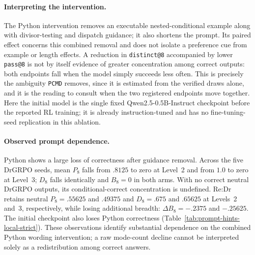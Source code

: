 \documentclass{article}
\newcommand{\1}{\mathbf 1}
\newcommand{\pmd}{\texttt{PCMD}}
\theoremstyle{remark}
\theoremstyle{definition}
\theoremstyle{plain}
\begin{document}
\paragraph{Interpreting the intervention.}
The Python intervention removes an executable nested-conditional example
along with divisor-testing and dispatch guidance; it also shortens the prompt.
Its paired effect concerns this combined removal and does not isolate a
preference cue from example or length effects. A reduction in
\texttt{distinct@8} accompanied by lower \texttt{pass@8} is not by itself
evidence of greater concentration among correct outputs: both endpoints fall
when the model simply succeeds less often. This is precisely the ambiguity
\pmd{} removes, since it is estimated from the verified draws alone, and it is
the reading to consult when the two registered endpoints move together.
Here the initial model is the single fixed Qwen2.5-0.5B-Instruct checkpoint
before the reported RL training; it is already instruction-tuned and has no
fine-tuning-seed replication in this ablation.


\paragraph{Observed prompt dependence.}
Python shows a large loss of correctness after guidance removal. Across the
five DrGRPO seeds, mean $P_8$ falls from $.8125$ to zero at Level~2 and from
$1.0$ to zero at Level~3; $D_8$ falls identically and $B_8=0$ in both arms.
With no correct neutral DrGRPO outputs, its conditional-correct concentration
is undefined. Re:Dr retains neutral $P_8=.55625$ and $.49375$ and
$D_8=.675$ and $.65625$ at Levels~2 and~3, respectively, while losing
additional breadth: $\Delta B_8=-.2375$ and $-.25625$. The initial checkpoint
also loses Python correctness (Table~\ref{tab:prompt-hints-local-strict}).
These observations identify substantial dependence on the combined Python
wording intervention; a raw mode-count decline cannot be interpreted solely
as a redistribution among correct answers.
\end{document}
